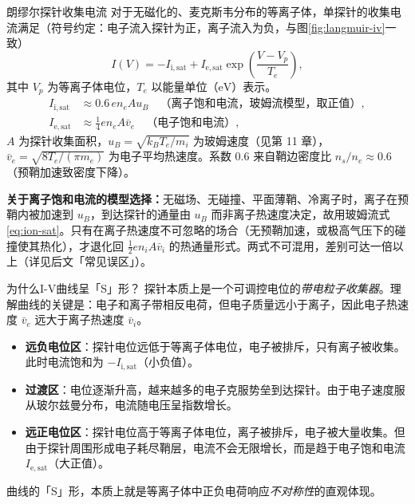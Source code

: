 \documentclass[12pt,a4paper,openany,oneside]{book}
\begin{document}
\begin{theorem}{朗缪尔探针收集电流}{}{}
对于无磁化的、麦克斯韦分布的等离子体，单探针的收集电流满足（符号约定：电子流入探针为正，离子流入为负，与图\ref{fig:langmuir-iv}一致）
\begin{equation}
I(V) = -I_{\mathrm{i,sat}} + I_{\mathrm{e,sat}}\exp\!\left(\frac{V - V_p}{T_e}\right),
\label{eq:langmuir-iv}
\end{equation}
其中 $V_p$ 为等离子体电位，$T_e$ 以能量单位（$\mathrm{eV}$）表示。
\begin{align}
I_{\mathrm{i,sat}} &\approx 0.6\, e n_e A u_B \quad \text{（离子饱和电流，玻姆流模型，取正值）},
\label{eq:ion-sat}\\
I_{\mathrm{e,sat}} &\approx \frac{1}{4} e n_e A \bar{v}_e \quad \text{（电子饱和电流）},
\label{eq:elec-sat}
\end{align}
$A$ 为探针收集面积，$u_B = \sqrt{k_BT_e/m_i}$ 为玻姆速度（见第 11 章），$\bar{v}_e = \sqrt{8 T_e / (\pi m_e)}$ 为电子平均热速度。系数 $0.6$ 来自鞘边密度比 $n_s/n_e\approx0.6$（预鞘加速致密度下降）。

\textbf{关于离子饱和电流的模型选择：}无磁场、无碰撞、平面薄鞘、冷离子时，离子在预鞘内被加速到 $u_B$，到达探针的通量由 $u_B$ 而非离子热速度决定，故用玻姆流式\eqref{eq:ion-sat}。只有在离子热速度不可忽略的场合（无预鞘加速，或极高气压下的碰撞使其热化），才退化回 $\frac12 en_iA\bar v_i$ 的热通量形式。两式不可混用，差别可达一倍以上（详见后文「常见误区」）。
\end{theorem}

\begin{insight}{为什么I-V曲线呈「S」形？}{}
探针本质上是一个可调控电位的\emph{带电粒子收集器}。理解曲线的关键是：电子和离子带相反电荷，但电子质量远小于离子，因此电子热速度 $\bar{v}_e$ 远大于离子热速度 $\bar{v}_i$。

\begin{itemize}
    \item \textbf{远负电位区}：探针电位远低于等离子体电位，电子被排斥，只有离子被收集。此时电流饱和为 $-I_{\mathrm{i,sat}}$（小负值）。
    \item \textbf{过渡区}：电位逐渐升高，越来越多的电子克服势垒到达探针。由于电子速度服从玻尔兹曼分布，电流随电压呈指数增长。
    \item \textbf{远正电位区}：探针电位高于等离子体电位，离子被排斥，电子被大量收集。但由于探针周围形成电子耗尽鞘层，电流不会无限增长，而是趋于电子饱和电流 $I_{\mathrm{e,sat}}$（大正值）。
\end{itemize}

曲线的「S」形，本质上就是等离子体中正负电荷响应\emph{不对称性}的直观体现。
\end{insight}
\end{document}
